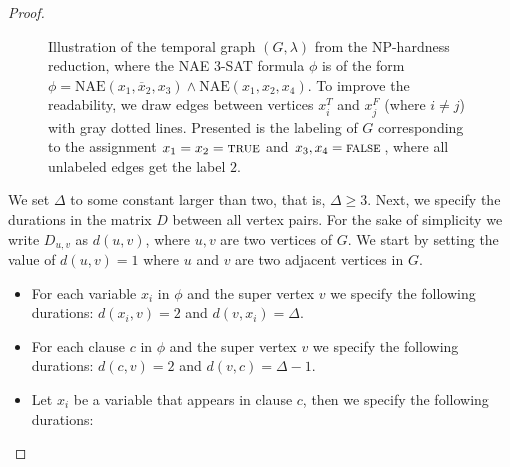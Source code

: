 \documentclass[a4paper,UKenglish,cleveref, autoref, thm-restate]{lipics-v2021}
\begin{document}
\begin{proof}
%
\begin{figure}[t]
	\noindent
\caption{Illustration of the temporal graph $(G,\lambda)$ from the NP-hardness reduction, 
	where the NAE 3-SAT formula $\phi$ is of the form $\phi = \text{NAE}(x_1, \overline{x}_2, x_3) \wedge \text{NAE}(x_1, x_2, x_4)$.
To improve the readability, we draw edges between vertices $x_i^T$ and $x_j^F$ (where $i \neq j$) with gray dotted lines.
Presented is the labeling of $G$ corresponding to the assignment $x_1=x_2=\textsc{true}$ and $x_3,x_4=\textsc{false}$,
where all unlabeled edges get the label $2$.
}\label{fig:NP-example}
\end{figure}
%
We set $\Delta$ to some constant larger than two, that is, $\Delta\ge 3$. Next, we specify the durations in the matrix $D$ between all vertex pairs.
For the sake of simplicity we write $D_{u,v}$ as $d(u,v)$,
where $u,v$ are two vertices of $G$. 
We start by setting the value of $d(u,v) = 1$ where $u$ and $v$ are two adjacent vertices in $G$.
\begin{itemize}
    \item For each variable $x_i$ in $\phi$ and the super vertex $v$
    we specify the following durations:
    $d(x_i,v)=2$ and $d(v,x_i)= \Delta $. %
    \item For each clause $c$ in $\phi$ and the super vertex $v$
    we specify the following durations:
    $d(c,v)=2$ and $d(v,c)= \Delta - 1$.
    \item Let $x_i$ be a variable that appears in clause $c$, then  we specify the following durations:

\end{itemize}
\end{proof}
\end{document}

